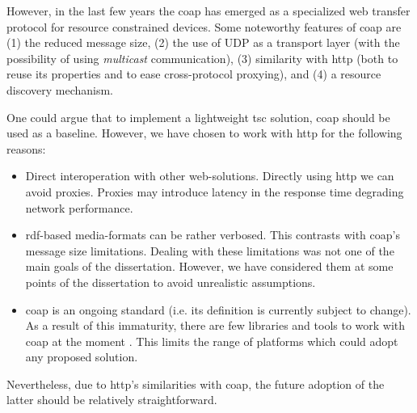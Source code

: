 However, in the last few years the \acf{coap}  has emerged as a specialized web transfer protocol for resource constrained devices. %
Some noteworthy features of \ac{coap} are
(1) the reduced message size,
(2) the use of UDP as a transport layer (with the possibility of using \emph{multicast} communication),
(3) similarity with \ac{http} (both to reuse its properties and to ease cross-protocol proxying), and
(4) a resource discovery mechanism. %


One could argue that to implement a lightweight \ac{tsc} solution, \ac{coap} should be used as a baseline.
However, we have chosen to work with \ac{http} for the following reasons:
\begin{itemize}
  \item Direct interoperation with other web-solutions.
        Directly using \ac{http} we can avoid proxies.
        Proxies may introduce latency in the response time degrading network performance. %
  \item \ac{rdf}-based media-formats can be rather verbosed.
	This contrasts with \ac{coap}'s message size limitations.
	Dealing with these limitations was not one of the main goals of the dissertation.
	However, we have considered them at some points of the dissertation to avoid unrealistic assumptions.
  \item \ac{coap} is an ongoing standard (i.e. its definition is currently subject to change).
        As a result of this immaturity, there are few libraries and tools to work with \ac{coap} at the moment \citep{villaverde_constrained_2012}. %
        This limits the range of platforms which could adopt any proposed solution. %
\end{itemize}


Nevertheless, due to \ac{http}'s similarities with \ac{coap}, the future adoption of the latter should be relatively straightforward.

